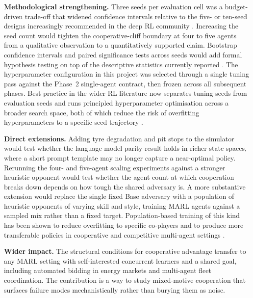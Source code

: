 \textbf{Methodological strengthening.} Three seeds per evaluation cell was a budget-driven trade-off that widened confidence intervals relative to the five- or ten-seed designs increasingly recommended in the deep RL community \citep{henderson2018deep, colas2018howmany}. Increasing the seed count would tighten the cooperative-cliff boundary at four to five agents from a qualitative observation to a quantitatively supported claim. Bootstrap confidence intervals and paired significance tests across seeds would add formal hypothesis testing on top of the descriptive statistics currently reported \citep{agarwal2021statistical}. The hyperparameter configuration in this project was selected through a single tuning pass against the Phase~2 single-agent contract, then frozen across all subsequent phases. Best practice in the wider RL literature now separates tuning seeds from evaluation seeds and runs principled hyperparameter optimisation across a broader search space, both of which reduce the risk of overfitting hyperparameters to a specific seed trajectory \citep{eimer2023hyperparameters}.

\textbf{Direct extensions.} Adding tyre degradation and pit stops to the simulator would test whether the language-model parity result holds in richer state spaces, where a short prompt template may no longer capture a near-optimal policy. Rerunning the four- and five-agent scaling experiments against a stronger heuristic opponent would test whether the agent count at which cooperation breaks down depends on how tough the shared adversary is. A more substantive extension would replace the single fixed Base adversary with a population of heuristic opponents of varying skill and style, training MARL agents against a sampled mix rather than a fixed target. Population-based training of this kind has been shown to reduce overfitting to specific co-players and to produce more transferable policies in cooperative and competitive multi-agent settings \citep{mckee2022quantifying, czempin2022reducing}.

\textbf{Wider impact.} The structural conditions for cooperative advantage transfer to any MARL setting with self-interested concurrent learners and a shared goal, including automated bidding in energy markets and multi-agent fleet coordination. The contribution is a way to study mixed-motive cooperation that surfaces failure modes mechanistically rather than burying them as noise.